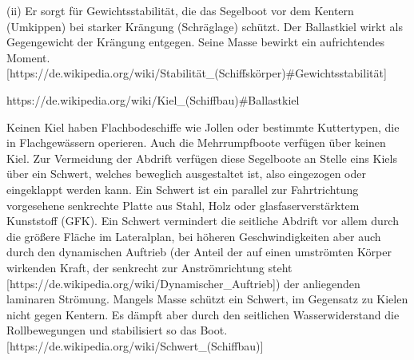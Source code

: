 (ii) Er sorgt für Gewichtsstabilität, die das Segelboot vor dem Kentern (Umkippen) bei starker Krängung (Schräglage) schützt. Der Ballastkiel wirkt als Gegengewicht der Krängung entgegen. Seine Masse  bewirkt  ein aufrichtendes Moment. [https://de.wikipedia.org/wiki/Stabilität_(Schiffskörper)#Gewichtsstabilität]


https://de.wikipedia.org/wiki/Kiel_(Schiffbau)#Ballastkiel

Keinen Kiel haben Flachbodeschiffe wie Jollen oder bestimmte Kuttertypen, die in Flachgewässern operieren. Auch die Mehrrumpfboote verfügen über keinen Kiel. Zur Vermeidung der Abdrift verfügen diese Segelboote an Stelle eins Kiels über ein Schwert, welches beweglich ausgestaltet ist, also eingezogen oder eingeklappt werden kann. Ein Schwert ist ein parallel zur Fahrtrichtung vorgesehene senkrechte Platte aus Stahl, Holz oder glasfaserverstärktem Kunststoff (GFK). 
Ein Schwert vermindert die seitliche Abdrift vor allem durch die größere Fläche im Lateralplan, bei höheren Geschwindigkeiten aber auch durch den dynamischen Auftrieb (der Anteil der auf einen umströmten Körper wirkenden Kraft, der senkrecht zur Anströmrichtung steht [https://de.wikipedia.org/wiki/Dynamischer_Auftrieb]) der anliegenden laminaren Strömung. Mangels Masse schützt ein Schwert, im Gegensatz zu Kielen nicht gegen Kentern. Es dämpft aber durch den seitlichen Wasserwiderstand die Rollbewegungen und stabilisiert so das Boot. [https://de.wikipedia.org/wiki/Schwert_(Schiffbau)]



